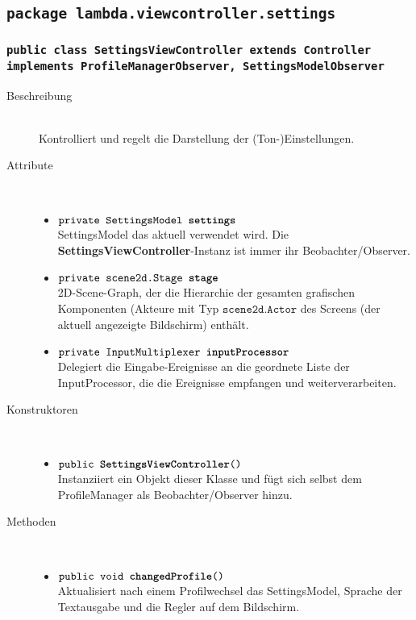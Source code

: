 \subsection{\texttt{package lambda.viewcontroller.settings}}

\subsubsection{\normalfont \texttt{public class \textbf{SettingsViewController} extends Controller implements ProfileManagerObserver, SettingsModelObserver}}

\begin{description}
\item[Beschreibung] \hfill \\ Kontrolliert und regelt die Darstellung der (Ton-)Einstellungen.
\item[Attribute] \hfill \\
	\vspace{-.8cm}
	\begin{itemize}
		\item $\texttt{private SettingsModel \textbf{settings}}$ \\ SettingsModel das aktuell verwendet wird. Die \textbf{SettingsViewController}-Instanz ist immer ihr Beobachter/Observer.
		\item $\texttt{private scene2d.Stage \textbf{stage}}$ \\ 2D-Scene-Graph, der die Hierarchie der gesamten grafischen Komponenten (Akteure mit Typ $\texttt{scene2d.Actor}$ des Screens (der aktuell angezeigte Bildschirm) enthält. 
		\item $\texttt{private InputMultiplexer \textbf{inputProcessor}}$ \\ Delegiert die Eingabe-Ereignisse an die geordnete Liste der InputProcessor, die die Ereignisse empfangen und weiterverarbeiten.
	\end{itemize}
	
\item[Konstruktoren] \hfill \\
	\vspace{-.8cm}
	\begin{itemize}
		\item $\texttt{public \textbf{SettingsViewController}()}$ \\ Instanziiert ein Objekt dieser Klasse und fügt sich selbst dem ProfileManager als Beobachter/Observer hinzu.
	\end{itemize}
	
\item[Methoden] \hfill \\
	\vspace{-.8cm}
	\begin{itemize}		
		\item $\texttt{public void \textbf{changedProfile}()}$ \\ Aktualisiert nach einem Profilwechsel das SettingsModel, Sprache der Textausgabe und die Regler auf dem Bildschirm.
				

\end{itemize}
\end{description}
